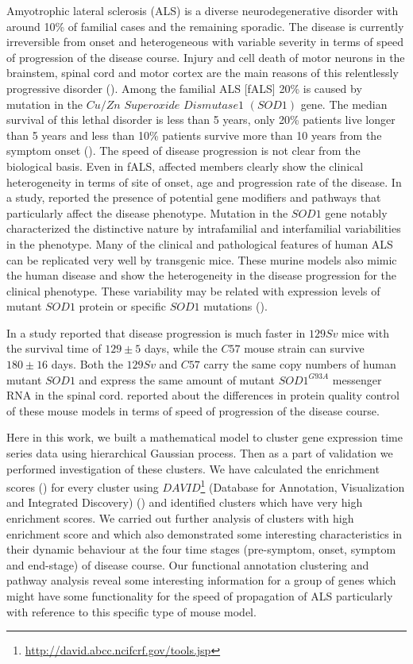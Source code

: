 Amyotrophic lateral sclerosis (ALS) is a diverse neurodegenerative disorder with around 10\% of familial cases and the remaining sporadic. The disease is currently irreversible from onset and heterogeneous with variable severity in terms of speed of progression of the disease course. Injury and cell death of motor neurons in the brainstem, spinal cord and motor cortex are the main reasons of this relentlessly progressive disorder (\cite{Brockington:2013, Ferraiuolo:2011, Haverkamp:1995, Peviani:2010}). Among the familial ALS [fALS] 20\% is caused by mutation in the $Cu/Zn$ $Superoxide$ $Dismutase 1$ $(SOD1)$ gene. The median survival of this lethal disorder is less than 5 years, only 20\% patients live longer than 5 years and less than 10\% patients survive more than 10 years from the symptom onset (\cite{Beghi:2011, Saccon:2013}). The speed of disease progression is not clear from the biological basis. Even in fALS, affected members clearly show the clinical heterogeneity in terms of site of onset, age and progression rate of the disease. In a study, \cite{Camu:1999} reported the presence of potential gene modifiers and pathways that particularly affect the disease phenotype. Mutation in the $SOD1$ gene notably characterized the distinctive nature by intrafamilial and interfamilial variabilities in the phenotype. Many of the clinical and pathological features of human ALS can be replicated very well by transgenic mice. These murine models also mimic the human disease and show the heterogeneity in the disease progression for the clinical phenotype. These variability may be related with expression levels of mutant $SOD1$ protein or specific $SOD1$ mutations (\cite{Turner:2008}).

In a study \cite{Pizzasegola:2009} reported that disease progression is much faster in $129Sv$ mice with the survival time of $129\pm5$ days, while the $C57$ mouse strain can survive $180\pm16$ days. Both the $129Sv$ and $C57$ carry the same copy numbers of human mutant $SOD1$ and express the same amount of mutant $SOD1^{G93A}$ messenger RNA in the spinal cord.  \cite{Marino:2015} reported about the differences in protein quality control of these mouse models in terms of speed of progression of the disease course.

Here in this work, we built a mathematical model to cluster gene expression time series data using hierarchical Gaussian process. Then as a part of validation we performed investigation of these clusters. We have calculated the enrichment scores (\cite{Huang:2007, Huang:2009Enrichment}) for every cluster using $DAVID$\footnote{\url{http://david.abcc.ncifcrf.gov/tools.jsp}} (Database for Annotation, Visualization and Integrated Discovery) (\cite{Huang:2009David}) and identified clusters which have very high enrichment scores.  We carried out further analysis of clusters with high enrichment score and which also demonstrated some interesting characteristics in their dynamic behaviour at the four time stages (pre-symptom, onset, symptom and end-stage) of disease course. Our functional annotation clustering and pathway analysis reveal some interesting information for a group of genes which might have some functionality for the speed of propagation of ALS particularly with reference to this specific type of mouse model. 

